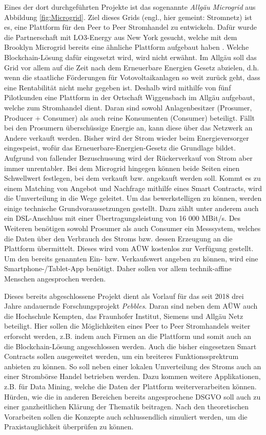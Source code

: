 Eines der dort durchgeführten Projekte ist das sogenannte \emph{Allgäu Microgrid} aus Abbildung \ref{fig:Microgrid}. Ziel dieses Grids (engl., hier gemeint: Stromnetz) ist es, eine Plattform für den Peer to Peer Stromhandel zu entwickeln. Dafür wurde die Partnerschaft mit LO3-Energy aus New York gesucht, welche mit dem Brooklyn Microgrid bereits eine ähnliche Plattform aufgebaut haben \cite[vgl.][]{BrooklynGrid2019}. Welche Blockchain-Lösung dafür eingesetzt wird, wird nicht erwähnt. Im Allgäu soll das Grid vor allem auf die Zeit nach dem Erneuerbare Energien Gesetz abzielen, d.h. wenn die staatliche Förderungen für Votovoltaikanlagen so weit zurück geht, dass eine Rentabilität nicht mehr gegeben ist. Deshalb wird mithilfe von fünf Pilotkunden eine Plattform in der Ortschaft Wiggensbach im Allgäu aufgebaut, welche zum Stromhandel dient. Daran sind sowohl Anlagenbesitzer (Prosumer, Producer + Consumer) als auch reine Konsumenten (Consumer) beteiligt. Fällt bei den Prosumern überschüssige Energie an, kann diese über das Netzwerk an Andere verkauft werden. Bisher wird der Strom wieder beim Energieversorger eingespeist, wofür das Erneuerbare-Energien-Gesetz die Grundlage bildet. Aufgrund von fallender Bezuschussung wird der Rückerverkauf von Strom aber immer unrentabler. Bei dem Microgrid hingegen können beide Seiten einen Schwellwert festlegen, bei dem verkauft bzw. angekauft werden soll. Kommt es zu einem Matching von Angebot und Nachfrage mithilfe eines Smart Contracts, wird die Umverteilung in die Wege geleitet. Um das bewerkstelligen zu können, werden einige technische Grundvoraussetzungen gestellt. Dazu zählt unter anderem auch ein DSL-Anschluss mit einer Übertragungsleistung von 16 000 MBit/s. Des Weiteren benötigen sowohl Prosumer als auch Consumer ein Messsystem, welches die Daten über den Verbrauch des Stroms bzw. dessen Erzeugung an die Plattform übermittelt. Dieses wird vom AÜW kostenlos zur Verfügung gestellt. Um den bereits genannten Ein- bzw. Verkaufswert angeben zu können, wird eine Smartphone-/Tablet-App benötigt. Daher sollen vor allem technik-affine Menschen angesprochen werden. \cite[vgl.][]{AÜW, Klaus2018}

Dieses bereits abgeschlossene Projekt dient als Vorlauf für das seit 2018 drei Jahre andauernde Forschungsprojekt \emph{Pebbles}. Daran sind neben dem AÜW auch die Hochschule Kempten, das Fraunhofer Institut, Siemens und Allgäu Netz beteiligt. Hier sollen die Möglichkeiten eines Peer to Peer Stromhandels weiter erforscht werden, z.B. indem auch Firmen an die Plattform und somit auch an die Blockchain-Lösung angeschlossen werden. Auch die bisher eingesetzen Smart Contracts sollen ausgeweitet werden, um ein breiteres Funktionssprektrum anbieten zu können. So soll neben einer lokalen Umverteilung des Stroms auch an einer Strombörse Handel betrieben werden. Dazu kommen weitere Applikationen, z.B. für Data Mining, welche die Daten der Plattform weiterverarbeiten können. \\
Hürden, wie die in anderen Bereichen bereits angesprochene DSGVO soll auch zu einer ganzheitlichen Klärung der Thematik beitragen. Nach den theoretischen Vorarbeiten sollen die Konzepte auch schlussendlich simuliert werden, um die Praxistauglichkeit überprüfen zu können. \cite[vgl.][]{Ziegler2018}


